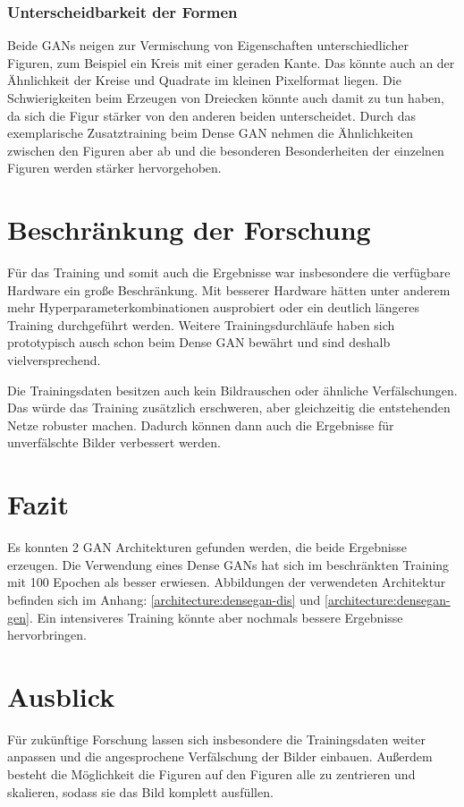 \subsubsection{Unterscheidbarkeit der Formen}
Beide GANs neigen zur Vermischung von Eigenschaften unterschiedlicher Figuren, zum Beispiel ein Kreis mit einer geraden Kante.
Das könnte auch an der Ähnlichkeit der Kreise und Quadrate im kleinen Pixelformat liegen.
Die Schwierigkeiten beim Erzeugen von Dreiecken könnte auch damit zu tun haben, da sich die Figur stärker von den anderen beiden unterscheidet.
Durch das exemplarische Zusatztraining beim Dense GAN nehmen die Ähnlichkeiten zwischen den Figuren aber ab und die besonderen Besonderheiten der einzelnen Figuren werden stärker hervorgehoben.

\section{Beschränkung der Forschung}
Für das Training und somit auch die Ergebnisse war insbesondere die verfügbare Hardware ein große Beschränkung.
Mit besserer Hardware hätten unter anderem mehr Hyperparameterkombinationen ausprobiert oder ein deutlich längeres Training durchgeführt werden.
Weitere Trainingsdurchläufe haben sich prototypisch ausch schon beim Dense GAN bewährt und sind deshalb vielversprechend.
\newline

Die Trainingsdaten besitzen auch kein Bildrauschen oder ähnliche Verfälschungen.
Das würde das Training zusätzlich erschweren, aber gleichzeitig die entstehenden Netze robuster machen.
Dadurch können dann auch die Ergebnisse für unverfälschte Bilder verbessert werden.

\section{Fazit}
Es konnten 2 GAN Architekturen gefunden werden, die beide Ergebnisse erzeugen.
Die Verwendung eines Dense GANs hat sich im beschränkten Training mit 100 Epochen als besser erwiesen.
Abbildungen der verwendeten Architektur befinden sich im Anhang: \cref{architecture:densegan-dis} und \cref{architecture:densegan-gen}.
Ein intensiveres Training könnte aber nochmals bessere Ergebnisse hervorbringen.

\section{Ausblick}
Für zukünftige Forschung lassen sich insbesondere die Trainingsdaten weiter anpassen und die angesprochene Verfälschung der Bilder einbauen.
Außerdem besteht die Möglichkeit die Figuren auf den Figuren alle zu zentrieren und skalieren, sodass sie das Bild komplett ausfüllen.

